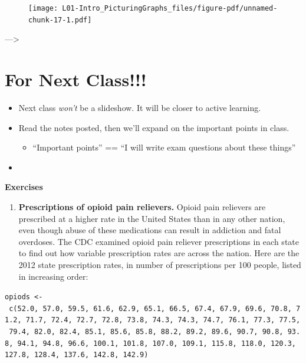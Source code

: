 \documentclass[
  letterpaper,
  DIV=11,
  numbers=noendperiod]{scrreprt}
\providecommand{\tightlist}{%
  \setlength{\itemsep}{0pt}\setlength{\parskip}{0pt}}\usepackage{longtable,booktabs,array}
\begin{document}
\begin{figure}[H]

{\centering \texttt{[image: L01-Intro\_PicturingGraphs\_files/figure-pdf/unnamed-chunk-17-1.pdf]}

}

\end{figure}

---\textgreater{}

\hypertarget{for-next-class}{%
\section{For Next Class!!!}\label{for-next-class}}

\begin{itemize}
\tightlist
\item
  Next class \emph{won't} be a slideshow. It will be closer to active
  learning.\lspace
\item
  Read the notes posted, then we'll expand on the important points in
  class.

  \begin{itemize}
  \tightlist
  \item
    ``Important points'' == ``I will write exam questions about these
    things''\lspace
  \end{itemize}
\item
\end{itemize}

\textbf{Exercises}

\begin{enumerate}
\def\labelenumi{\arabic{enumi}.}
\tightlist
\item
  \textbf{Prescriptions of opioid pain relievers.} Opioid pain relievers
  are prescribed at a higher rate in the United States than in any other
  nation, even though abuse of these medications can result in addiction
  and fatal overdoses. The CDC examined opioid pain reliever
  prescriptions in each state to find out how variable prescription
  rates are across the nation. Here are the 2012 state prescription
  rates, in number of prescriptions per 100 people, listed in increasing
  order:
\end{enumerate}

\texttt{opiods\ \textless{}-\ c(52.0,\ 57.0,\ 59.5,\ 61.6,\ 62.9,\ 65.1,\ 66.5,\ 67.4,\ 67.9,\ 69.6,\ 70.8,\ 71.2,\ 71.7,\ 72.4,\ 72.7,\ 72.8,\ 73.8,\ 74.3,\ 74.3,\ 74.7,\ 76.1,\ 77.3,\ 77.5,\ 79.4,\ 82.0,\ 82.4,\ 85.1,\ 85.6,\ 85.8,\ 88.2,\ 89.2,\ 89.6,\ 90.7,\ 90.8,\ 93.8,\ 94.1,\ 94.8,\ 96.6,\ 100.1,\ 101.8,\ 107.0,\ 109.1,\ 115.8,\ 118.0,\ 120.3,\ 127.8,\ 128.4,\ 137.6,\ 142.8,\ 142.9)}
\end{document}
